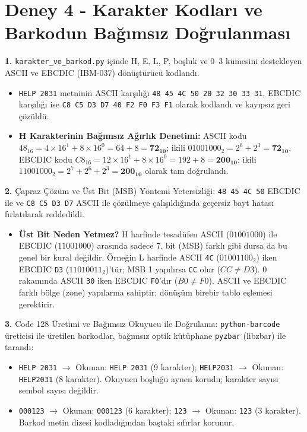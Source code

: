 \documentclass[10pt,a4paper]{article}
\begin{document}
\newpage

\section*{Deney 4 - Karakter Kodları ve Barkodun Bağımsız Doğrulanması}

\textbf{1.} \texttt{karakter\_ve\_barkod.py} içinde H, E, L, P, boşluk ve 0--3 kümesini destekleyen ASCII ve EBCDIC (IBM-037) dönüştürücü kodlandı.
\begin{itemize}
    \item \texttt{HELP 2031} metninin ASCII karşılığı \texttt{48 45 4C 50 20 32 30 33 31}, EBCDIC karşılığı ise \texttt{C8 C5 D3 D7 40 F2 F0 F3 F1} olarak kodlandı ve kayıpsız geri çözüldü.
    \item \textbf{H Karakterinin Bağımsız Ağırlık Denetimi:} ASCII kodu $48_{16} = 4\times 16^1 + 8\times 16^0 = 64+8 = \mathbf{72_{10}}$; ikili $01001000_2 = 2^6 + 2^3 = \mathbf{72_{10}}$. EBCDIC kodu $C8_{16} = 12\times 16^1 + 8\times 16^0 = 192+8 = \mathbf{200_{10}}$; ikili $11001000_2 = 2^7 + 2^6 + 2^3 = \mathbf{200_{10}}$ olarak tam doğrulandı.
\end{itemize}

\textbf{2.} Çapraz Çözüm ve Üst Bit (MSB) Yöntemi Yetersizliği:
\texttt{48 45 4C 50} EBCDIC ile ve \texttt{C8 C5 D3 D7} ASCII ile çözülmeye çalışıldığında geçersiz bayt hatası fırlatılarak reddedildi.
\begin{itemize}
    \item \textbf{Üst Bit Neden Yetmez?} H harfinde tesadüfen ASCII ($01001000$) ile EBCDIC ($11001000$) arasında sadece 7. bit (MSB) farklı gibi dursa da bu genel bir kural değildir. Örneğin L harfinde ASCII \texttt{4C} ($01001100_2$) iken EBCDIC \texttt{D3} ($11010011_2$)'tür; MSB 1 yapılırsa \texttt{CC} olur ($CC \ne D3$). 0 rakamında ASCII \texttt{30} iken EBCDIC \texttt{F0}'dır ($B0 \ne F0$). ASCII ve EBCDIC farklı bölge (zone) yapılarına sahiptir; dönüşüm birebir tablo eşlemesi gerektirir.
\end{itemize}

\textbf{3.} Code 128 Üretimi ve Bağımsız Okuyucu ile Doğrulama:
\texttt{python-barcode} üreticisi ile üretilen barkodlar, bağımsız optik kütüphane \texttt{pyzbar} (libzbar) ile tarandı:
\begin{itemize}
    \item \texttt{HELP 2031} $\rightarrow$ Okunan: \texttt{HELP 2031} (9 karakter); \texttt{HELP2031} $\rightarrow$ Okunan: \texttt{HELP2031} (8 karakter). Okuyucu boşluğu aynen korudu; karakter sayısı sembol sayısı değildir.
    \item \texttt{000123} $\rightarrow$ Okunan: \texttt{000123} (6 karakter); \texttt{123} $\rightarrow$ Okunan: \texttt{123} (3 karakter). Barkod metin dizesi kodladığından baştaki sıfırlar korunur.
\end{itemize}
\end{document}
